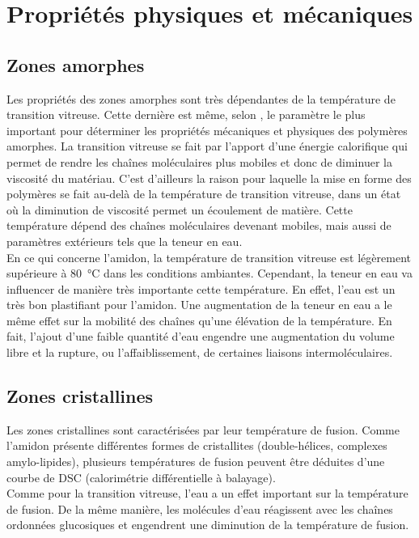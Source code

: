 \section*{Propriétés physiques et mécaniques}
	\subsection*{Zones amorphes}
		Les propriétés des zones amorphes sont très dépendantes de la température de transition vitreuse. Cette dernière est même, selon \citet{plazek_glass_2007}, le paramètre le plus important pour déterminer les propriétés mécaniques et physiques des polymères amorphes. La transition vitreuse se fait par l'apport d'une énergie calorifique qui permet de rendre les chaînes moléculaires plus mobiles et donc de diminuer la viscosité du matériau. C'est d'ailleurs la raison pour laquelle la mise en forme des polymères se fait au-delà de la température de transition vitreuse, dans un état où la diminution de viscosité permet un écoulement de matière. Cette température dépend des chaînes moléculaires devenant mobiles, mais aussi de paramètres extérieurs tels que la teneur en eau.
		\\En ce qui concerne l'amidon, la température de transition vitreuse est légèrement supérieure à \SI{80}{\celsius} dans les conditions ambiantes. Cependant, la teneur en eau va influencer de manière très importante cette température. En effet, l'eau est un très bon plastifiant pour l'amidon. Une augmentation de la teneur en eau a le même effet sur la mobilité des chaînes qu'une élévation de la température. En fait, l'ajout d'une faible quantité d'eau engendre une augmentation du volume libre et la rupture, ou l'affaiblissement, de certaines liaisons intermoléculaires.
	\subsection*{Zones cristallines}
		Les zones cristallines sont caractérisées par leur température de fusion. Comme l'amidon présente différentes formes de cristallites (double-hélices, complexes amylo-lipides), plusieurs températures de fusion peuvent être déduites d'une courbe de DSC (calorimétrie différentielle à balayage).
		\\Comme pour la transition vitreuse, l'eau a un effet important sur la température de fusion. De la même manière, les molécules d'eau réagissent avec les chaînes ordonnées glucosiques et engendrent une diminution de la température de fusion.
